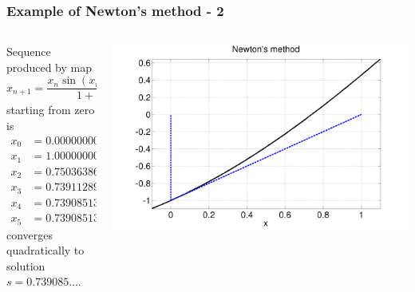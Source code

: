 \documentclass{beamer}
\begin{document}
\begin{frame}
  \frametitle{Example of Newton's method - 2}

  \begin{columns}
    \begin{column}{0.5\textwidth}
      \begin{overlayarea}{\textwidth}{0.9\textheight}
        {
          Sequence produced by map
          \begin{equation*}
            x_{n+1} = \frac{x_n \sin(x_n) + \cos(x_n)}{1 + \sin(x_n)},
          \end{equation*}
          starting from zero is
          \begin{align*}
            x_0 & = 0.0000000000 \\
            x_1 & = 1.0000000000 \\
            x_2 & = 0.7503638678 \\
            x_3 & = 0.7391128909 \\
            x_4 & = 0.7390851334 \\
            x_5 & = 0.7390851332
          \end{align*}
        }
        {
          converges quadratically to solution $s =
          0.739085\dots$.
        }
      \end{overlayarea}
    \end{column}
    \begin{column}{0.5\textwidth}
      \begin{overlayarea}{\textwidth}{0.6\textheight}
        {
          \begin{center}
            \includegraphics[width=\textwidth]{figures/NewtonMap2}

\end{center}}
\end{overlayarea}
\end{column}
\end{columns}
\end{frame}
\end{document}
